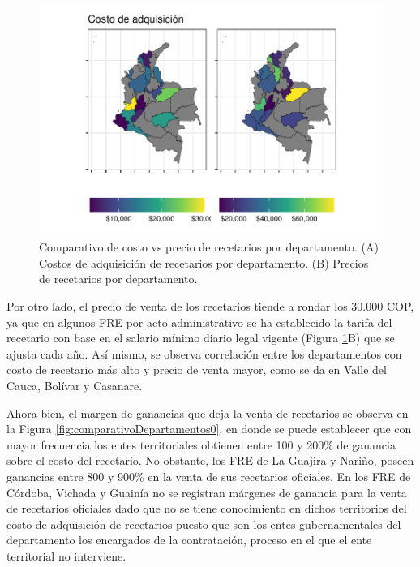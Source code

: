 \documentclass[
  oneside]{book}
\begin{document}
\begin{figure}

{\centering \includegraphics[width=0.9\linewidth]{InformeFinal_files/figure-latex/costoRecetario-1} 

}

\caption{Comparativo de costo vs precio de recetarios por departamento. (A) Costos de adquisición de recetarios por departamento. (B) Precios de recetarios por departamento.}\label{fig:costoRecetario}
\end{figure}

Por otro lado, el precio de venta de los recetarios tiende a rondar los 30.000 COP, ya que en algunos FRE por acto administrativo se ha establecido la tarifa del recetario con base en el salario mínimo diario legal vigente (Figura \ref{fig:costoRecetario}B) que se ajusta cada año. Así mismo, se observa correlación entre los departamentos con costo de recetario más alto y precio de venta mayor, como se da en Valle del Cauca, Bolívar y Casanare.

Ahora bien, el margen de ganancias que deja la venta de recetarios se observa en la Figura \ref{fig:comparativoDepartamentos0}, en donde se puede establecer que con mayor frecuencia los entes territoriales obtienen entre 100 y 200\% de ganancia sobre el costo del recetario. No obstante, los FRE de La Guajira y Nariño, poseen ganancias entre 800 y 900\% en la venta de sus recetarios oficiales. En los FRE de Córdoba, Vichada y Guainía no se registran márgenes de ganancia para la venta de recetarios oficiales dado que no se tiene conocimiento en dichos territorios del costo de adquisición de recetarios puesto que son los entes gubernamentales del departamento los encargados de la contratación, proceso en el que el ente territorial no interviene.
\end{document}
